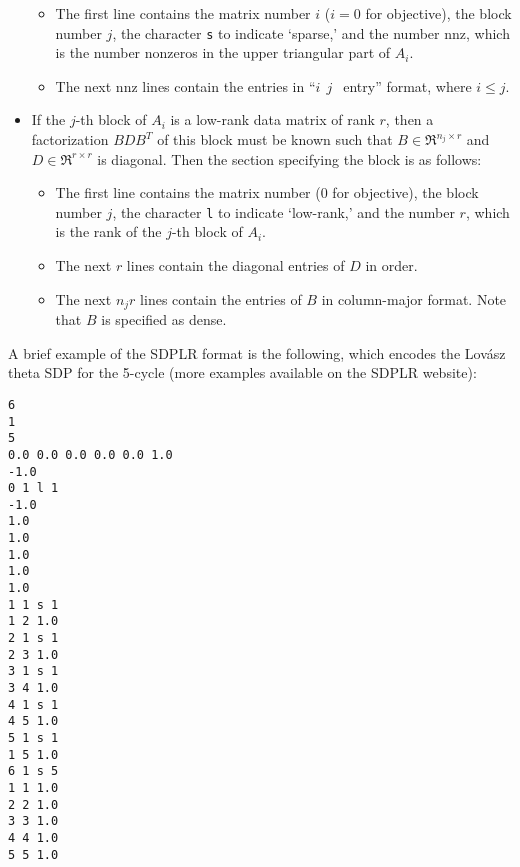 \documentclass[12pt]{article}
\begin{document}
\begin{itemize}
\begin{itemize}
\item The first line contains the matrix number $i$ ($i = 0$ for
objective), the block number $j$, the character {\tt s} to indicate
`sparse,' and the number nnz, which is the number nonzeros in the upper
triangular part of $A_i$.

\item The next nnz lines contain the entries in ``$i \ \ j \ \ $
entry'' format, where $i \le j$.

\end{itemize}

\item If the $j$-th block of $A_i$ is a low-rank data matrix of rank
$r$, then a factorization $B D B^T$ of this block must be known such
that $B \in \Re^{n_j \times r}$ and $D \in \Re^{r \times r}$ is
diagonal. Then the section specifying the block is as follows:

\begin{itemize}

\item The first line contains the matrix number (0 for objective), the
block number $j$, the character {\tt l} to indicate `low-rank,' and the
number $r$, which is the rank of the $j$-th block of $A_i$.

\item The next $r$ lines contain the diagonal entries of $D$ in
order.

\item The next $n_j r$ lines contain the entries of $B$ in
column-major format. Note that $B$ is specified as dense.

\end{itemize}

\end{itemize}

A brief example of the SDPLR format is the following, which encodes
the Lov\'asz theta SDP for the 5-cycle (more examples
available on the SDPLR website):
\begin{verbatim}
6
1
5
0.0 0.0 0.0 0.0 0.0 1.0
-1.0
0 1 l 1
-1.0
1.0
1.0
1.0
1.0
1.0
1 1 s 1
1 2 1.0
2 1 s 1
2 3 1.0
3 1 s 1
3 4 1.0
4 1 s 1
4 5 1.0
5 1 s 1
1 5 1.0
6 1 s 5
1 1 1.0
2 2 1.0
3 3 1.0
4 4 1.0
5 5 1.0
\end{verbatim}

%
%
\end{document}
